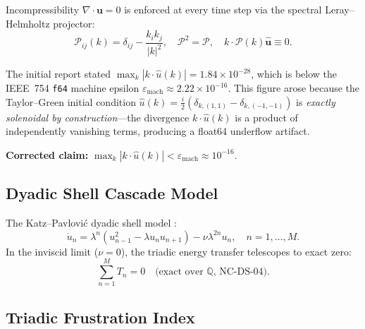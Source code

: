 \documentclass[11pt,a4paper,twoside]{article}
\newcommand{\Proj}{\mathcal{P}}
\begin{document}
Incompressibility $\nabla \cdot \mathbf{u} = 0$ is enforced at every time step via the spectral Leray--Helmholtz projector:
\begin{equation}
\Proj_{ij}(k) = \delta_{ij} - \frac{k_i k_j}{|k|^2}, \quad
\Proj^2 = \Proj, \quad
k \cdot \Proj(k)\hat{\mathbf{u}} \equiv 0.
\label{eq:leray}
\end{equation}

\begin{clarification}[title={PR1-\S3A: Precision of Divergence Residual}]
The initial report stated $\max_k |k \cdot \hat{u}(k)| = 1.84 \times 10^{-28}$, which is below the IEEE~754 \texttt{f64} machine epsilon $\varepsilon_{\text{mach}} \approx 2.22 \times 10^{-16}$. This figure arose because the Taylor--Green initial condition $\hat{u}(k) = \frac{i}{2}(\delta_{k,(1,1)} - \delta_{k,(-1,-1)})$ is \emph{exactly solenoidal by construction}---the divergence $k \cdot \hat{u}(k)$ is a product of independently vanishing terms, producing a float64 underflow artifact.

\textbf{Corrected claim:} $\max_k |k \cdot \hat{u}(k)| < \varepsilon_{\text{mach}} \approx 10^{-16}$.
\end{clarification}

\subsection{Dyadic Shell Cascade Model}

The Katz--Pavlovi\'c dyadic shell model \cite{katz2002caffarelli}:
\begin{equation}
\dot{u}_n = \lambda^n(u_{n-1}^2 - \lambda u_n u_{n+1}) - \nu \lambda^{2n} u_n, \quad n = 1,\ldots,M.
\label{eq:dyadic}
\end{equation}
In the inviscid limit ($\nu = 0$), the triadic energy transfer telescopes to exact zero:
\begin{equation}
\sum_{n=1}^{M} T_n = 0 \quad \text{(exact over $\mathbb{Q}$, NC-DS-04)}.
\label{eq:telescoping}
\end{equation}

\subsection{Triadic Frustration Index}
\end{document}
